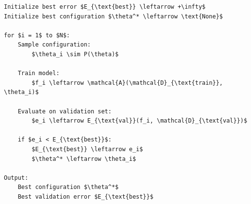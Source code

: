 \begin{enumerate}
\begin{lstlisting}[language=pseudo-code,mathescape=true,style={pseudocode-style},caption={Random Search}]
Initialize best error $E_{\text{best}} \leftarrow +\infty$
Initialize best configuration $\theta^* \leftarrow \text{None}$

for $i = 1$ to $N$:
    Sample configuration:
        $\theta_i \sim P(\theta)$

    Train model:
        $f_i \leftarrow \mathcal{A}(\mathcal{D}_{\text{train}}, \theta_i)$

    Evaluate on validation set:
        $e_i \leftarrow E_{\text{val}}(f_i, \mathcal{D}_{\text{val}})$

    if $e_i < E_{\text{best}}$:
        $E_{\text{best}} \leftarrow e_i$
        $\theta^* \leftarrow \theta_i$

Output:
    Best configuration $\theta^*$
    Best validation error $E_{\text{best}}$
\end{lstlisting}



\end{enumerate}
